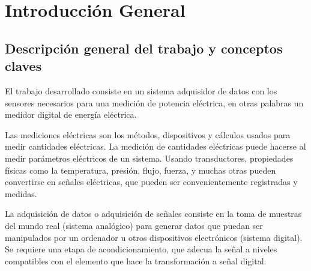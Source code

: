 
\chapter{Introducción General} %

\label{Chapter1} %
\label{IntroGeneral}


\newcommand{\keyword}[1]{\textbf{#1}}
\newcommand{\tabhead}[1]{\textbf{#1}}
\newcommand{\code}[1]{\texttt{#1}}
\newcommand{\file}[1]{\texttt{\bfseries#1}}
\newcommand{\option}[1]{\texttt{\itshape#1}}
\newcommand{\grados}{$^{\circ}$}



\section{Descripción general del trabajo y conceptos claves}

El trabajo desarrollado consiste en un sistema adquisidor de datos con los sensores necesarios para una medición de potencia eléctrica, en otras palabras un medidor digital de energía eléctrica.

Las mediciones eléctricas son los métodos, dispositivos y cálculos usados para medir cantidades eléctricas. La medición de cantidades eléctricas puede hacerse al medir parámetros eléctricos de un sistema. Usando transductores, propiedades físicas como la temperatura, presión, flujo, fuerza, y muchas otras pueden convertirse en señales eléctricas, que pueden ser convenientemente registradas y medidas. 


La adquisición de datos o adquisición de señales consiste en la toma de muestras del mundo real (sistema analógico) para generar datos que puedan ser manipulados por un ordenador u otros dispositivos electrónicos (sistema digital). Se requiere una etapa de acondicionamiento, que adecua la señal a niveles compatibles con el elemento que hace la transformación a señal digital.\citep{NIDataAdquisition}

